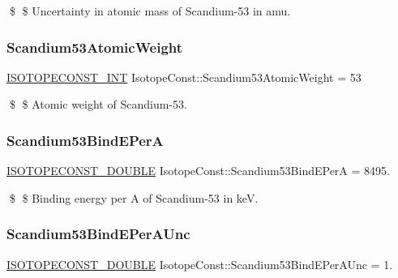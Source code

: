\$ \$ Uncertainty in atomic mass of Scandium-\/53 in amu. \mbox{\label{group___isotope_const-_scandium-_sc53_gaa16c3d6d1aa03bea88e16e4d06de861f}} 
\subsubsection{\texorpdfstring{Scandium53\+Atomic\+Weight}{Scandium53AtomicWeight}}
{\footnotesize\ttfamily \mbox{\hyperlink{group___isotope_const-_macros_ga5f18360b3e99483a35c32d789e62621c}{I\+S\+O\+T\+O\+P\+E\+C\+O\+N\+S\+T\+\_\+\+I\+NT}} Isotope\+Const\+::\+Scandium53\+Atomic\+Weight = 53}

\$ \$ Atomic weight of Scandium-\/53. \mbox{\label{group___isotope_const-_scandium-_sc53_gab87f12e1763adbe17fbbaf9770123209}} 
\subsubsection{\texorpdfstring{Scandium53\+Bind\+E\+PerA}{Scandium53BindEPerA}}
{\footnotesize\ttfamily \mbox{\hyperlink{group___isotope_const-_macros_ga8f45a7272ce02c0b4c65c44636ed719a}{I\+S\+O\+T\+O\+P\+E\+C\+O\+N\+S\+T\+\_\+\+D\+O\+U\+B\+LE}} Isotope\+Const\+::\+Scandium53\+Bind\+E\+PerA = 8495.}

\$ \$ Binding energy per A of Scandium-\/53 in keV. \mbox{\label{group___isotope_const-_scandium-_sc53_ga0b7cbdf53bab617c307c78e59d92be5f}} 
\subsubsection{\texorpdfstring{Scandium53\+Bind\+E\+Per\+A\+Unc}{Scandium53BindEPerAUnc}}
{\footnotesize\ttfamily \mbox{\hyperlink{group___isotope_const-_macros_ga8f45a7272ce02c0b4c65c44636ed719a}{I\+S\+O\+T\+O\+P\+E\+C\+O\+N\+S\+T\+\_\+\+D\+O\+U\+B\+LE}} Isotope\+Const\+::\+Scandium53\+Bind\+E\+Per\+A\+Unc = 1.}

